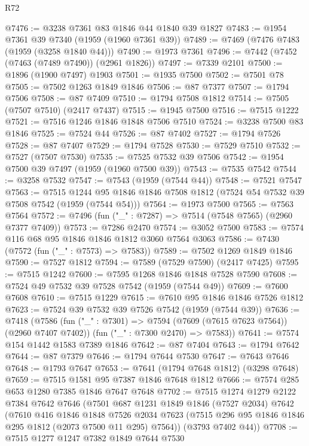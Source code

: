 \begin{lexlean}{R72}
\begin{coremodule}
@7476 := @3238 @7361 @83 @1846 @44 @1840 @39 @1827
@7483 := @1954 @7361 @39 @7340 (@1959 (@1960 @7361 @39))
@7489 := @7469 (@7476 @7483 (@1959 (@3258 @1840 @44)))
@7490 := @1973 @7361
@7496 := @7442 (@7452 (@7463 (@7489 @7490)) (@2961 @1826))
@7497 := @7339 @2101
@7500 := @1896 (@1900 @7497) @1903
@7501 := @1935 @7500
@7502 := @7501 @78
@7505 := @7502 @1263 @1849 @1846
@7506 := @87 @7377
@7507 := @1794 @7506
@7508 := @87 @7409
@7510 := @1794 @7508 @1812
@7514 := @7505 (@7507 @7510) (@2417 @7437)
@7515 := @1945 @7500
@7516 := @7515 @1222
@7521 := @7516 @1246 @1846 @1848 @7506 @7510
@7524 := @3238 @7500 @83 @1846
@7525 := @7524 @44
@7526 := @87 @7402
@7527 := @1794 @7526
@7528 := @87 @7407
@7529 := @1794 @7528
@7530 := @7529 @7510
@7532 := @7527 (@7507 @7530)
@7535 := @7525 @7532 @39 @7506
@7542 := @1954 @7500 @39 @7497 (@1959 (@1960 @7500 @39))
@7543 := @7535 @7542
@7544 := @3258 @7532
@7547 := @7543 (@1959 (@7544 @44))
@7548 := @7521 @7547
@7563 := @7515
    @1244
    @95
    @1846
    @1846
    @7508
    @1812
    (@7524 @54 @7532 @39 @7508 @7542 (@1959 (@7544 @54)))
@7564 := @1973 @7500
@7565 := @7563 @7564
@7572 := @7496 (fun ("_" : @7287) => @7514 (@7548 @7565) (@2960 @7377 @7409))
@7573 := @7286 @2470
@7574 := @3052 @7500
@7583 := @7574 @116 @68 @95 @1846 @1846 @1812 @3060 @7564 @3063
@7586 := @7430 (@7572 (fun ("_" : @7573) => @7583))
@7589 := @7502 @1269 @1849 @1846
@7590 := @7527 @1812
@7594 := @7589 (@7529 @7590) (@2417 @7425)
@7595 := @7515 @1242
@7600 := @7595 @1268 @1846 @1848 @7528 @7590
@7608 := @7524 @49 @7532 @39 @7528 @7542 (@1959 (@7544 @49))
@7609 := @7600 @7608
@7610 := @7515 @1229
@7615 := @7610 @95 @1846 @1846 @7526 @1812
@7623 := @7524 @39 @7532 @39 @7526 @7542 (@1959 (@7544 @39))
@7636 := @7418
    (@7586
      (fun ("_" : @7301) => @7594 (@7609 (@7615 @7623 @7564)) (@2960 @7407 @7402))
      (fun ("_" : @7300 @2470) => @7583))
@7641 := @7574 @154 @1442 @1583 @7389 @1846
@7642 := @87 @7404
@7643 := @1794 @7642
@7644 := @87 @7379
@7646 := @1794 @7644 @7530
@7647 := @7643 @7646
@7648 := @1793 @7647
@7653 := @7641 (@1794 @7648 @1812) (@3298 @7648)
@7659 := @7515 @1581 @95 @7387 @1846 @7648 @1812
@7666 := @7574 @285 @653 @1280 @7385 @1846 @7647 @7648
@7702 := @7515
    @1274
    @1279
    @2122
    @7384
    @7642
    @7646
    (@7501
      @687
      @1231
      @1849
      @1846
      (@7527 @2034)
      @7642
      (@7610
        @416
        @1846
        @1848
        @7526
        @2034
        @7623
        (@7515 @296 @95 @1846 @1846 @295 @1812 (@2073 @7500 @11 @295) @7564))
      (@3793 @7402 @44))
@7708 := @7515 @1277 @1247 @7382 @1849 @7644 @7530

\end{coremodule}
\end{lexlean}
